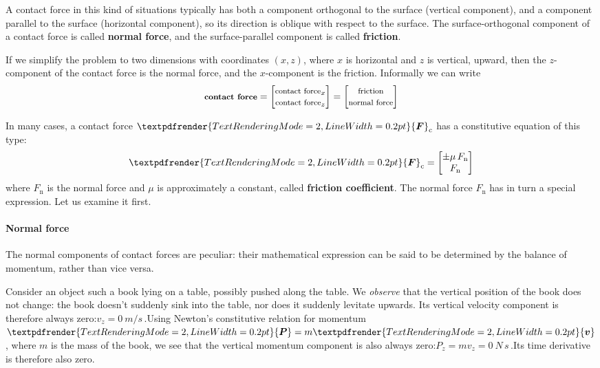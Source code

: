 \documentclass[a4paper,12pt,%
onecolumn,oneside,%
british%
]{memoir}
\renewcommand*{\bm}[1]{\textpdfrender{TextRenderingMode=2,LineWidth=0.2pt}{\boldsymbol{#1}}}
\renewcommand*{\|}[1][]{\nonscript\:#1\vert\nonscript\:\mathopen{}}
\newcommand*{\yfri}{\mu} %
\newcommand*{\yv}{\bm{v}}
\newcommand*{\yM}{m}%
\newcommand*{\yP}{\bm{P}}
\newcommand*{\yF}{\bm{F}}
\newcommand*{\yFc}{\yF_{\text{c}}}
\newcommand*{\yFn}{F_{\text{n}}}
\begin{document}
A contact force in this kind of situations typically has both a component orthogonal to the surface (vertical component), and a component parallel to the surface (horizontal component), so its direction is oblique with respect to the surface. The surface-orthogonal component of a contact force is called \textbf{normal force}, and the surface-parallel component is called \textbf{friction}.

If we simplify the problem to two dimensions with coordinates $(x,z)$, where $x$ is horizontal and $z$ is vertical, upward, then the $z$-component of the contact force is the normal force, and the $x$-component is the friction. Informally we can write
\begin{equation*}
  \textbf{\footnotesize contact force}
  =
  \begin{bmatrix}
    \text{\footnotesize contact force}_{x}
    \\
    \text{\footnotesize contact force}_{z}
  \end{bmatrix}
  =
  \begin{bmatrix}
    \text{\footnotesize friction}
    \\
    \text{\footnotesize normal force}
  \end{bmatrix}
\end{equation*}

In many cases, a contact force $\yFc$ has a constitutive equation of this type:
\begin{equation}\label{eq:contact_force_2D}
  \yFc =
  \begin{bmatrix}
    \pm\yfri\, \yFn \\
    \yFn
  \end{bmatrix}
\end{equation}
where $\yFn$ is the normal force and $\yfri$ is approximately a constant, called \textbf{friction coefficient}. The normal force $\yFn$ has in turn a special expression. Let us examine it first.

\paragraph{Normal force}
\label{sec:normal_force}

The normal components of contact forces are peculiar: their mathematical expression can be said to be determined by the balance of momentum, rather than vice versa.

Consider an object such a book lying on a table, possibly pushed along the table. We \emph{observe} that the vertical position of the book does not change: the book doesn't suddenly sink into the table, nor does it suddenly levitate upwards. Its vertical velocity component is therefore always zero:\enspace$v_{z} = \qty{0}{m/s}$\,.\enspace Using Newton's constitutive relation for momentum $\yP=\yM\yv$, where $\yM$ is the mass of the book, we see that the vertical momentum component is also always zero:\enspace$P_{z}=\yM v_{z} = \qty{0}{N\,s}$\,.\enspace Its time derivative is therefore also zero.
\end{document}
